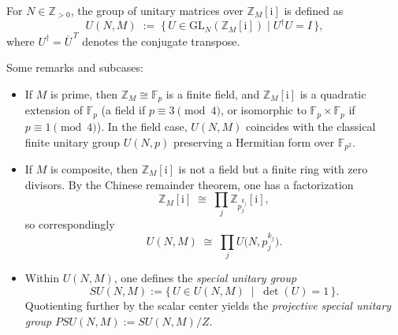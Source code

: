 \documentclass[10pt, a4paper]{article}
\newcommand{\ii}{\mathrm{i}}
\numberwithin{equation}{section}
\begin{document}
For $N \in \mathbb{Z}_{>0}$, the group of unitary matrices over $\mathbb{Z}_M[\ii]$ is defined as
\[
  U(N,M) \;:=\; \bigl\{\, U \in \mathrm{GL}_N(\mathbb{Z}_M[\ii]) \;\big|\; U^\dagger U = I \,\bigr\},
\]
where $U^\dagger = \overline{U}^{\,T}$ denotes the conjugate transpose.

\medskip
\noindent
Some remarks and subcases:
\begin{itemize}
  \item If $M$ is prime, then $\mathbb{Z}_M \cong \mathbb{F}_p$ is a finite field, and $\mathbb{Z}_M[\ii]$ is a quadratic extension of $\mathbb{F}_p$ (a field if $p \equiv 3 \pmod{4}$, or isomorphic to $\mathbb{F}_p \times \mathbb{F}_p$ if $p \equiv 1 \pmod{4}$). 
  In the field case, $U(N,M)$ coincides with the classical finite unitary group $U(N,p)$ preserving a Hermitian form over $\mathbb{F}_{p^2}$.

  \item If $M$ is composite, then $\mathbb{Z}_M[\ii]$ is not a field but a finite ring with zero divisors. 
  By the Chinese remainder theorem, one has a factorization
  \[
    \mathbb{Z}_M[\ii] \;\cong\; \prod_j \mathbb{Z}_{p_j^{k_j}}[\ii],
  \]
  so correspondingly
  \[
    U(N,M) \;\cong\; \prod_j U\!\bigl(N, p_j^{k_j}\bigr).
  \]

  \item Within $U(N,M)$, one defines the \emph{special unitary group} 
  \[
    SU(N,M) := \{\, U \in U(N,M) \;\;|\;\; \det(U) = 1 \,\}.
  \]
  Quotienting further by the scalar center yields the \emph{projective special unitary group} $PSU(N,M) := SU(N,M)/Z$.
\end{itemize}
\end{document}
